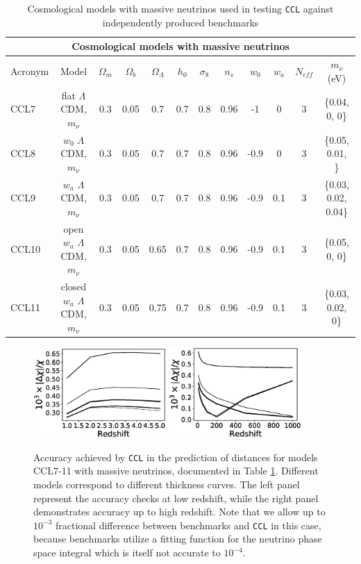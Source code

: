\documentclass[\docopts]{\docclass}
\newcommand{\ccl}{{\tt CCL}\xspace}
\begin{document}
\begin{table}[t]
  \centering
  \begin{tabular}{ l c | c c c c c c c c c c }
    \hline
    \multicolumn{12}{|c|}{Cosmological models with massive neutrinos} \\
    \hline
    \hline
    Acronym & Model & $\Omega_m$ & $\Omega_b$ & $\Omega_\Lambda$ & $h_0$ & $\sigma_8$ & $n_s$ & $w_0$ & $w_a$ & $N_{eff}$ & $m_\nu$ (eV) \\
    \hline
    CCL7 & flat $\Lambda$CDM, $m_\nu$ & 0.3 & 0.05 & 0.7 & 0.7 & 0.8 & 0.96 & -1 & 0 & 3 & \{0.04, 0, 0\} \\
    CCL8 & $w_0$ $\Lambda$CDM, $m_\nu$ & 0.3 & 0.05 & 0.7 & 0.7 & 0.8 & 0.96 & -0.9 & 0 & 3 & \{0.05, 0.01, \} \\
    CCL9 & $w_a$ $\Lambda$CDM, $m_\nu$ & 0.3 & 0.05 & 0.7 & 0.7 & 0.8 & 0.96 & -0.9 & 0.1 & 3 & \{0.03, 0.02, 0.04\} \\
    CCL10 & open $w_a$ $\Lambda$CDM, $m_\nu$ & 0.3 & 0.05 & 0.65 & 0.7 & 0.8 & 0.96 & -0.9 & 0.1 & 3 & \{0.05, 0, 0\}  \\
    CCL11 & closed $w_a$ $\Lambda$CDM, $m_\nu$ & 0.3 & 0.05 & 0.75 & 0.7 & 0.8 & 0.96 & -0.9 & 0.1 & 3 &\{0.03, 0.02, 0\} \\
    \hline
  \end{tabular}
  \caption{Cosmological models with massive neutrinos used in testing \ccl against independently produced benchmarks}
  \label{tab:cosmologies_nu}
\end{table}

\begin{figure}
  \centering
  \includegraphics[width=0.45\textwidth]{distances_nu}
  \includegraphics[width=0.45\textwidth]{distances_nu_hiz}
  \caption{Accuracy achieved by \ccl in the prediction of distances for models CCL7-11 with massive neutrinos, documented in Table \ref{tab:cosmologies_nu}. Different models correspond to different thickness curves. The left panel represent the accuracy checks at low redshift, while the right panel demonstrates accuracy up to high redshift. Note that we allow up to $10^{-3}$ fractional difference between benchmarks and \ccl in this case, because benchmarks utilize a fitting function for the neutrino phase space integral which is itself not accurate to $10^{-4}$.}
  \label{fig:distancegrow_nu}
\end{figure}
\end{document}
